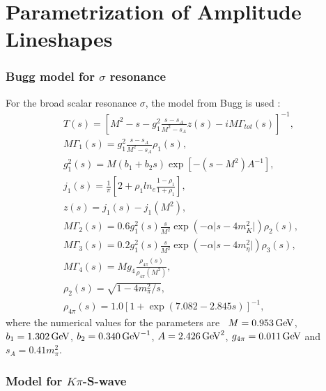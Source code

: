 
\section{Parametrization of Amplitude Lineshapes}
\label{sec:AmpLineShapes}

\setcounter{figure}{0}
\setcounter{table}{0}
\renewcommand{\thefigure}{A.\arabic{figure}}
\renewcommand{\thetable}{A.\arabic{table}}


\subsubsection*{Bugg model for $\sigma$ resonance}

 For the broad scalar resonance $\sigma$,
     the model from Bugg is used \cite{BuggSigma}:
\begin{eqnarray}
T(s) = [M^{2} - s - g^{2}_{1}\frac{s - s_{A}}{M^{2} - s_{A}} z(s) -iM\Gamma_{tot}(s)]^{-1},\\
M\Gamma_{1}(s) = g^{2}_{1}\frac{s - s_{A}}{M^{2} - s_{A}}\rho_{1}(s),\\
g^{2}_{1}(s) = M(b_{1} + b_{2}s)\exp[-(s-M^{2})A^{-1}],\\
j_{1}(s) = \frac{1}{\pi}[2 + \rho_{1}ln_{e}\frac{1 - \rho_{1}}{1 + \rho_{1}}],\\
z(s) = j_{1}(s) - j_{1}(M^{2}),\\
M\Gamma_{2}(s) = 0.6 g^{2}_{1}(s)\frac{s}{M^{2}}\exp(-\alpha \vert s - 4m^{2}_{K}\vert)\rho_{2}(s),\\
M\Gamma_{3}(s) = 0.2 g^{2}_{1}(s)\frac{s}{M^{2}}\exp(-\alpha \vert s - 4m^{2}_{\eta}\vert)\rho_{3}(s),\\
M\Gamma_{4}(s) = M g_{4}\frac{\rho_{4\pi}(s)}{\rho_{4\pi}(M^{2})},\\
\rho_{2}(s) = \sqrt{1-4m_\pi^2/s},   \\
\rho_{4\pi}(s) = 1.0 [1 + \exp(7.082 - 2.845 s)]^{-1},
\end{eqnarray}
where the numerical values for the parameters are~\cite{BuggSigma} $M = 0.953 \mathrm{\,Ge\kern -0.1em V}$, $b_{1} = 1.302 \mathrm{\,Ge\kern -0.1em V}$, $b_{2} = 0.340 \mathrm{\,Ge\kern -0.1em V}^{-1}$, $A = 2.426 \mathrm{\,Ge\kern -0.1em V}^{2}$, $g_{4\pi} = 0.011 \mathrm{\,Ge\kern -0.1em V}$
and $s_A = 0.41 m_\pi^2$.

\subsubsection*{Model for $K\pi$-S-wave}


